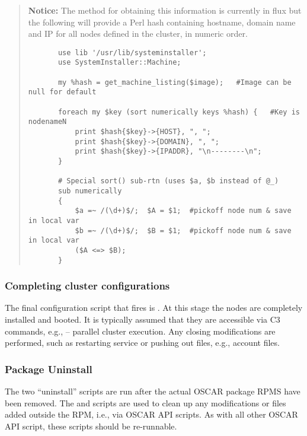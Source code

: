 \begin{verse}
   {\bfseries Notice: } The method for obtaining this information is
   currently in flux but the following will provide a Perl hash containing
   hostname,  domain name and IP for all nodes defined in the cluster, in
   numeric order.
  \begin{footnotesize}
  \begin{verbatim}
       use lib '/usr/lib/systeminstaller';
       use SystemInstaller::Machine;

       my %hash = get_machine_listing($image);   #Image can be null for default

       foreach my $key (sort numerically keys %hash) {   #Key is nodenameN
           print $hash{$key}->{HOST}, ", ";
           print $hash{$key}->{DOMAIN}, ", ";
           print $hash{$key}->{IPADDR}, "\n--------\n";
       }

       # Special sort() sub-rtn (uses $a, $b instead of @_)
       sub numerically 
       {
           $a =~ /(\d+)$/;  $A = $1;  #pickoff node num & save in local var
           $b =~ /(\d+)$/;  $B = $1;  #pickoff node num & save in local var
           ($A <=> $B);
       }
  \end{verbatim}
  \end{footnotesize}
\end{verse}



\subsubsection{Completing cluster configurations}

The final configuration script that fires is .  At this
stage the nodes are completely installed and booted.  It is typically
assumed that they are accessible via C3 commands, e.g.,  --
parallel cluster execution.  Any closing modifications are performed, such as
restarting service or pushing out files, e.g.,  account files.

\subsubsection{Package Uninstall}

The two ``uninstall'' scripts are run after the actual OSCAR package RPMS
have been removed.  The  and
 scripts are used to clean up any
modifications or files added outside the RPM, i.e., via OSCAR API scripts.
As with all other OSCAR API script, these scripts should be re-runnable.

